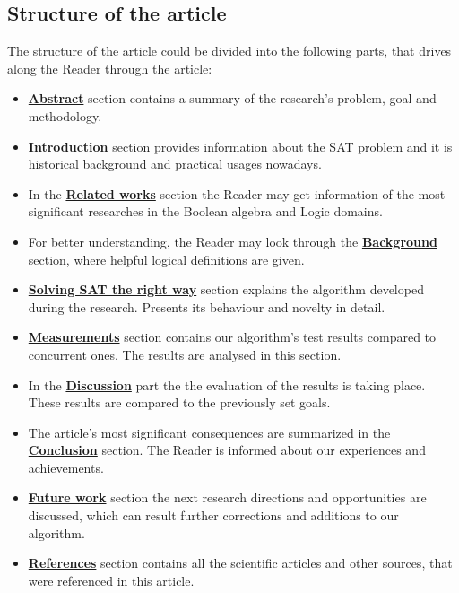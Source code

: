\documentclass{article}
\begin{document}
\subsection{Structure of the article}
The structure of the article could be divided into the following parts, that drives along the Reader through the article:
\begin{itemize}
    \item \hyperref[sec:abstract]{\textbf{Abstract}} section contains a summary of the research's problem, goal and methodology.
    \item \hyperref[sec:intro]{\textbf{Introduction}} section provides information about the SAT problem and it is historical background and practical usages nowadays.
    \item In the \hyperref[sec:relwork]{\textbf{Related works}} section the Reader may get information of the most significant researches in the Boolean algebra and Logic domains.
    \item For better understanding, the Reader may look through the \hyperref[sec:background]{\textbf{Background}} section, where helpful logical definitions are given.
    \item \hyperref[sec:methodology]{\textbf{Solving SAT the right way}} section explains the algorithm developed during the research. Presents its behaviour and novelty in detail.
    \item \hyperref[sec:measurements]{\textbf{Measurements}} section contains our algorithm's test results compared to concurrent ones. The results are analysed in this section.
    \item In the \hyperref[sec:discussion]{\textbf{Discussion}} part the the evaluation of the results is taking place. These results are compared to the previously set goals.
    \item The article's most significant consequences are summarized in the \hyperref[sec:conclusion]{\textbf{Conclusion}} section. The Reader is informed about our experiences and achievements.
    \item \hyperref[sec:future]{\textbf{Future work}} section the next research directions and opportunities are discussed, which can result further corrections and additions to our algorithm.
    \item \hyperref[sec:bib]{\textbf{References}} section contains all the scientific articles and other sources, that were referenced in this article.
\end{itemize}

\end{document}
